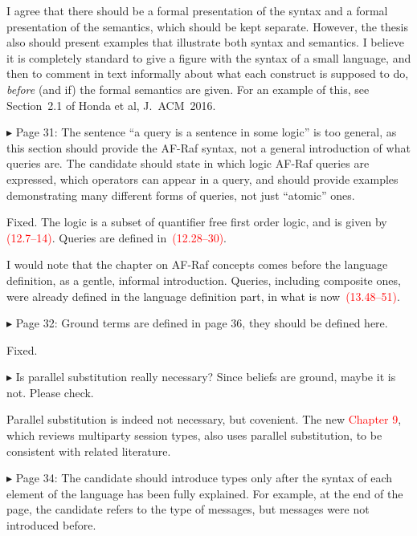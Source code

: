 \documentclass{article}
\newcommand*\R[1]{\textcolor{red}{#1}} %
\newenvironment{them}%
  {\bigskip\noindent\begingroup\color{blue}$\blacktriangleright$\enspace}%
  {\endgroup\par}
\begin{document}
I agree that there should be a formal presentation of the syntax
  and a formal presentation of the semantics,
  which should be kept separate.
However, the thesis also should present examples
  that illustrate both syntax and semantics.
I believe it is completely standard to give a figure
  with the syntax of a small language,
and then to comment in text informally about what each construct
  is supposed to do,
  \emph{before} (and if) the formal semantics are given.
For an example of this,
  see Section~2.1 of Honda et al, J.~ACM~2016.


\begin{them}
Page 31:
The sentence ``a query is a sentence in some logic'' is too general, as this
section should provide the AF-Raf syntax, not a general introduction of what
queries are. The candidate should state in which logic AF-Raf queries are
expressed, which operators can appear in a query, and should provide examples
demonstrating many different forms of queries, not just ``atomic'' ones.
\end{them}
Fixed.
The logic is a subset of quantifier free first order logic,
  and is given by \R{(12.7--14)}.
Queries are defined in~\R{(12.28--30)}.

I would note that the chapter on AF-Raf concepts
  comes before the language definition,
  as a gentle, informal introduction.
Queries, including composite ones,
  were already defined in the language definition part,
  in what is now~\R{(13.48--51)}.

\begin{them}
Page 32:
Ground terms are defined in page 36, they should be defined here.
\end{them}
Fixed.

\begin{them}
Is parallel substitution really necessary? Since beliefs are ground, maybe it
is not. Please check.
\end{them}

Parallel substitution is indeed not necessary, but covenient.
The new \R{Chapter 9},
  which reviews multiparty session types,
  also uses parallel substitution,
    to be consistent with related literature.


\begin{them}
Page 34:
The candidate should introduce types only after the syntax of each element of
the language has been fully explained. For example, at the end of the page, the
candidate refers to the type of messages, but messages were not introduced
before.
\end{them}
\end{document}
